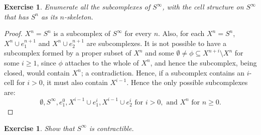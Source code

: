 \documentclass{article}
\newtheorem{exercise}[theorem]{Exercise}
\begin{document}
\begin{exercise}
Enumerate all the subcomplexes of $S^\infty$, with the cell structure on $S^\infty$ that has $S^n$ as its $n$-skeleton.
\end{exercise}
\begin{proof}
$X^n=S^n$ is a subcomplex of $S^\infty$ for every $n$. Also, for each $X^n=S^n$, $X^n\cup e_{1}^{n+1}$ and $X^n\cup e_{2}^{n+1}$ are subcomplexes. It is not possible to have a subcomplex formed by a proper subset of $X^n$ and some $\emptyset\neq\phi\subseteq X^{n+i}\setminus X^n$ for some $i\geq 1$, since $\phi$ attaches to the whole of $X^n$, and hence the subcomplex, being closed, would contain $X^n$; a contradiction. Hence, if a subcomplex contains an $i$-cell for $i>0$, it must also contain $X^{i-1}$. Hence the only possible subcomplexes are:
\[\emptyset, S^\infty, e_1^0, X^{i-1}\cup e_1^i,X^{i-1}\cup e_2^i \text{ for } i>0,\text{ and } X^n\text{ for }n\geq 0.\]
\end{proof}

\begin{exercise}
Show that $S^\infty$ is contractible.
\end{exercise}
\end{document}
